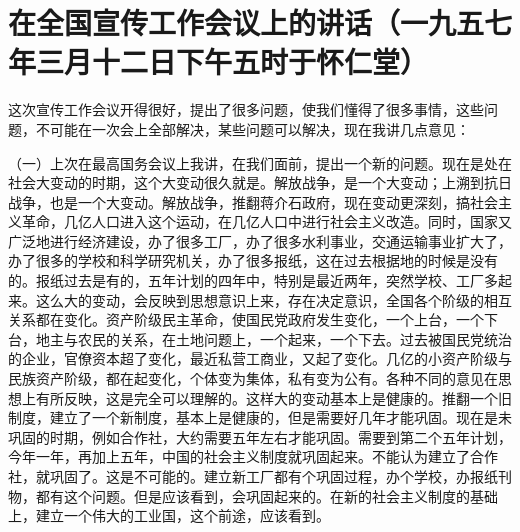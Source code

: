 \section[在全国宣传工作会议上的讲话（一九五七年三月十二日下午五时于怀仁堂）]{在全国宣传工作会议上的讲话（一九五七年三月十二日下午五时于怀仁堂）}


这次宣传工作会议开得很好，提出了很多问题，使我们懂得了很多事情，这些问题，不可能在一次会上全部解决，某些问题可以解决，现在我讲几点意见：

（一）上次在最高国务会议上我讲，在我们面前，提出一个新的问题。现在是处在社会大变动的时期，这个大变动很久就是。解放战争，是一个大变动；上溯到抗日战争，也是一个大变动。解放战争，推翻蒋介石政府，现在变动更深刻，搞社会主义革命，几亿人口进入这个运动，在几亿人口中进行社会主义改造。同时，国家又广泛地进行经济建设，办了很多工厂，办了很多水利事业，交通运输事业扩大了，办了很多的学校和科学研究机关，办了很多报纸，这在过去根据地的时候是没有的。报纸过去是有的，五年计划的四年中，特别是最近两年，突然学校、工厂多起来。这么大的变动，会反映到思想意识上来，存在决定意识，全国各个阶级的相互关系都在变化。资产阶级民主革命，使国民党政府发生变化，一个上台，一个下台，地主与农民的关系，在土地问题上，一个起来，一个下去。过去被国民党统治的企业，官僚资本超了变化，最近私营工商业，又起了变化。几亿的小资产阶级与民族资产阶级，都在起变化，个体变为集体，私有变为公有。各种不同的意见在思想上有所反映，这是完全可以理解的。这样大的变动基本上是健康的。推翻一个旧制度，建立了一个新制度，基本上是健康的，但是需要好几年才能巩固。现在是未巩固的时期，例如合作社，大约需要五年左右才能巩固。需要到第二个五年计划，今年一年，再加上五年，中国的社会主义制度就巩固起来。不能认为建立了合作社，就巩固了。这是不可能的。建立新工厂都有个巩固过程，办个学校，办报纸刊物，都有这个问题。但是应该看到，会巩固起来的。在新的社会主义制度的基础上，建立一个伟大的工业国，这个前途，应该看到。

